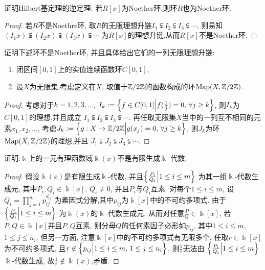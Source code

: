 \documentclass[oneside,a4papar,11pt,UTF8]{book}
\begin{document}
\begin{enumerate}
  \begin{prob}\label{ex-15-1-1}
    证明Hilbert基定理的逆定理:
    若$R[x]$为Noether环,则环$R$也为Noether环.
  \end{prob}

  \begin{proof}
    若$R$不是Noethre环,
    取$R$的无限理想升链$I_1\subsetneqq I_2\subsetneqq I_3\subsetneqq\cdots$,
    则易知$(I_1x)\subsetneqq(I_2x)\subsetneqq(I_3x)\subsetneqq\cdots$
    为$R[x]$的理想升链,从而$R[x]$不是Noether环.
  \end{proof}

  \begin{prob}\label{ex-15-1-2}
    证明下述环不是Noether环,
    并且具体给出它们的一列无限理想升链:
    \begin{enumerate}
      \item 闭区间$[0,1]$上的实值连续函数环$C[0,1]$,
      \item 设$X$为无限集,考虑定义在$X$,
      取值于$\mathbb{Z}/2\mathbb{Z}$的函数构成的环$\operatorname{Map}(X,\mathbb{Z}/2\mathbb{Z})$.
    \end{enumerate}
  \end{prob}

  \begin{proof}
    考虑对于$k=1,2,3,...$,
    $I_k:=\Big\{ f\in C[0,1] \Big| f(\frac{1}{j})=0,\,\forall j\geq k \Big\}$,
    则$I_k$为$C[0,1]$的理想,并且成立
    $I_1\subsetneqq I_2\subsetneqq I_3\subsetneqq \cdots$.
    再任取无限集$X$当中的一列互不相同的元素$x_1,x_2,...$,
    考虑$J_k:=\Big\{ g:X\to\mathbb{Z}/2\mathbb{Z} \Big| g(x_j)=0,\,\forall j\geq k \Big\}$,
    则$J_k$为环$\operatorname{Map}(X,\mathbb{Z}/2\mathbb{Z})$的理想,并且
    $J_1\subsetneqq J_2\subsetneqq J_3\subsetneqq \cdots$.
  \end{proof}

  \begin{prob}\label{ex-15-1-3}
    证明:$\Bbbk$上的一元有理函数域$\Bbbk(x)$不是有限生成$\Bbbk$-代数.
  \end{prob}

  \begin{proof}
    假设$\Bbbk(x)$是有限生成$\Bbbk$-代数,
    并且$\Big\{ \frac{P_i}{Q_i} \Big| 1\leq i\leq m \Big\}$
    为其一组$\Bbbk$-代数生成元,
    其中$P_i,Q_i\in\Bbbk[x]$, $Q_i\neq 0$,
    并且$P_i$与$Q_i$互素.
    对每个$1\leq i\leq m$,
    设$Q_i=\prod_{j=1}^{n_i}p_{ij}^{d_{ij}}$
    为素因式分解,其中$p_{ij}$为$\Bbbk[x]$中的不可约多项式.
    由于$\Big\{ \frac{P_i}{Q_i} \Big| 1\leq i\leq m \Big\}$
    为$\Bbbk(x)$的$\Bbbk$-代数生成元,
    从而对任意$\frac{P}{Q}\in\Bbbk[x]$,
    若$P,Q\in\Bbbk[x]$并且$P,Q$互素,
    则分母$Q$的任何素因子必形如$p_{ij}$,
    其中$1\leq i\leq m$, $1\leq j\leq n_i$.
    但另一方面,
    注意$\Bbbk[x]$中的不可约多项式有无限多个,
    任取$r\in\Bbbk[x]$为不可约多项式,
    且$r\not\in\Big\{ p_{ij} \Big| 1\leq i\leq m,
    \, 1\leq j\leq n_i \Big\}$,
    则$\frac{1}{r}$无法由
    $\Big\{ \frac{P_i}{Q_i} \Big| 1\leq i\leq m \Big\}$ $\Bbbk$-代数生成,
    故$\frac 1r\not\in\Bbbk(x)$,矛盾.
  \end{proof}


\end{enumerate}
\end{document}
